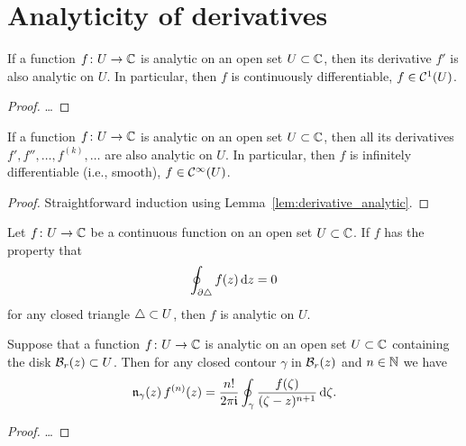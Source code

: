 \section{Analyticity of derivatives}

\begin{lemma}
  \label{lem:derivative_analytic}
  If a function $f \colon U \to \mathbb{C}$ is analytic on an open set $U \subset \mathbb{C}$,
  then its derivative $f'$ is also analytic on $U$.
  In particular, then $f$ is continuously differentiable,
  $f \in \mathcal{C}^{{1}}(U)$.
\end{lemma}
\begin{proof}
  \ldots
\end{proof}

\begin{corollary}
  \label{lem:higher_derivatives_analytic}
  If a function $f \colon U \to \mathbb{C}$ is analytic on an open set $U \subset \mathbb{C}$,
  then all its derivatives $f', f'', \ldots, f^{(k)}, \ldots$ are also analytic on $U$.
  In particular, then $f$ is infinitely differentiable (i.e., smooth),
  $f \in \mathcal{C}^{{\infty}}(U)$.
\end{corollary}
\begin{proof}
  Straightforward induction using Lemma~\ref{lem:derivative_analytic}.
\end{proof}

\begin{theorem}
  \label{thm:morera}
  Let $f \colon U \to \mathbb{C}$ be a continuous function on an open set $U \subset \mathbb{C}$.
  If $f$ has the property that
  \begin{align*}
    \oint_{\partial \triangle} f(z) \, \mathrm{d} z = 0
  \end{align*}
  for any closed triangle $\triangle \subset U$, then $f$ is analytic on $U$.
\end{theorem}

\begin{theorem}
  \label{thm:cauchy_formula_derivative}
  Suppose that a function $f \colon U \to \mathbb{C}$ is analytic on an open
  set $U \subset \mathbb{C}$ containing the disk $\mathcal{B}_{{r}}(z) \subset U$.
  Then for any closed contour $\gamma$ in $\mathcal{B}_{{r}}(z)$
  and $n \in \mathbb{N}$ we have
  \begin{align*}
    \mathfrak{n}_{{\gamma}}(z) \, f^{(n)}(z)
      = \frac{n!}{2\pi \mathfrak{i}} \oint_\gamma \frac{f(\zeta)}{(\zeta - z)^{n+1}} \, \mathrm{d} \zeta .
  \end{align*}
\end{theorem}
\begin{proof}
  \ldots
\end{proof}

